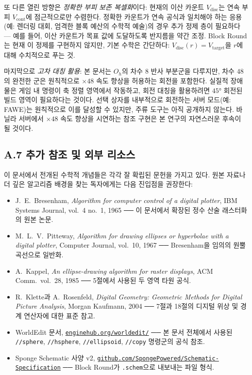 \documentclass[12pt,a4paper]{scrartcl}
\newcommand{\code}[1]{\texttt{\small #1}}
\newcommand{\cmd}[1]{\textcolor{earth}{\texttt{\small #1}}}
\newcommand{\biblink}[2]{\href{#1}{\nolinkurl{#2}}}
\begin{document}
또 다른 열린 방향은 \emph{정확한 부피 보존 복셀화}이다: 현재의 이산 카운트 $V_{\mathrm{disc}}$는 연속 부피 $V_{\mathrm{cont}}$에 점근적으로만 수렴한다. 정확한 카운트가 연속 공식과 일치해야 하는 응용(예: 렌더링 대회, 엄격한 블록 예산의 수학적 예술)의 경우 추가 정제 층이 필요하다 — 예를 들어, 이산 카운트가 목표 값에 도달하도록 반지름을 약간 조정. Block Round는 현재 이 정제를 구현하지 않지만, 기본 수학은 간단하다: $V_{\mathrm{disc}}(r) = V_{\mathrm{target}}$을 $r$에 대해 수치적으로 푸는 것.

마지막으로 \emph{고차 대칭 활용}: 본 문서는 $O_h$의 차수 $8$ 반사 부분군을 다루지만, 차수 $48$의 완전한 군은 원칙적으로 $\times 48$ 속도 향상을 허용하는 회전을 포함한다. 실질적 장애물은 게임 내 명령이 축 정렬 영역에서 작동하고, 회전 대칭을 활용하려면 $45°$ 회전된 빌드 영역이 필요하다는 것이다. 선택 상자를 내부적으로 회전하는 서버 모드(예: FAWE)는 원칙적으로 이를 달성할 수 있지만, 주류 도구는 아직 공개하지 않는다. 바닐라 서버에서 $\times 48$ 속도 향상을 시연하는 참조 구현은 본 연구의 자연스러운 후속이 될 것이다.

\subsection*{A.7 추가 참조 및 외부 리소스}

이 문서에서 전개된 수학적 개념들은 각각 잘 확립된 문헌을 가지고 있다. 원본 자료나 더 깊은 알고리즘 배경을 찾는 독자에게는 다음 진입점을 권장한다:

\begin{itemize}[leftmargin=1.4em,itemsep=0.2em,topsep=0.3em]
  \item J.~E.~Bresenham, \emph{Algorithm for computer control of a digital plotter}, IBM Systems Journal, vol.~4 no.~1, 1965 ── 이 문서에서 확장된 정수 산술 래스터화의 원본 논문.
  \item M.~L.~V.~Pitteway, \emph{Algorithm for drawing ellipses or hyperbolae with a digital plotter}, Computer Journal, vol.~10, 1967 ── Bresenham을 임의의 원뿔 곡선으로 일반화.
  \item A.~Kappel, \emph{An ellipse-drawing algorithm for raster displays}, ACM Comm.\ vol.~28, 1985 ── 5절에서 사용된 두 영역 타원 공식.
  \item R.~Klette과 A.~Rosenfeld, \emph{Digital Geometry: Geometric Methods for Digital Picture Analysis}, Morgan Kaufmann, 2004 ── 7절과 18절의 디지털 위상 및 경계 연산자에 대한 표준 참고.
  \item WorldEdit 문서, \biblink{https://enginehub.org/worldedit/}{enginehub.org/worldedit/} ── 본 문서 전체에서 사용된 \cmd{//sphere}, \cmd{//hsphere}, \cmd{//ellipsoid}, \cmd{//copy} 명령군의 공식 참조.
  \item Sponge Schematic 사양 v2, \biblink{https://github.com/SpongePowered/Schematic-Specification}{github.com/SpongePowered/Schematic-Specification} ── Block Round가 \code{.schem}으로 내보내는 파일 형식.
\end{itemize}
\end{document}
